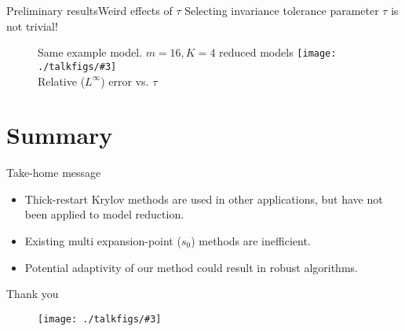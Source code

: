 \documentclass{beamer}
\theoremstyle{remark}
\newcommand{\putfig}[3][{}]{\texttt{[image: ./talkfigs/\#3]}} %
\begin{document}
\begin{frame}{Preliminary results}{Weird effects of $\tau$}
Selecting invariance tolerance parameter $\tau$ is not trivial!
	\begin{figure}[htbp]
	Same example model. $m=16, K=4$ reduced models
		\centering
		\putfig{.60}{ex308s1_m16r4_errVsTau.png}\\
		Relative ($L^\infty$) error vs. $\tau$
	\end{figure}
\end{frame}




\section*{Summary}

\begin{frame}{Take-home message}
  \begin{itemize}
  \item
     \alert{Thick-restart} Krylov methods are used in other applications,
     but have not been applied to model reduction.
  
  \bigskip
  \item Existing multi expansion-point ($s_0$) methods are inefficient.
  
  \bigskip
  \item Potential \alert{adaptivity} of our method could result in robust algorithms.
  \end{itemize}
\end{frame}

	
\begin{frame}{Thank you}
\begin{figure}
		\centering
		\putfig[{102 127}]{.20}{images.jpeg}
	\end{figure}
\end{frame}
\end{document}
